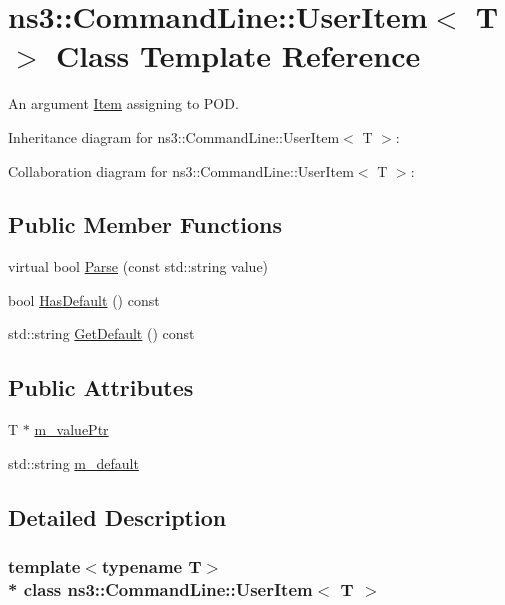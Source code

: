 \hypertarget{classns3_1_1CommandLine_1_1UserItem}{}\section{ns3\+:\+:Command\+Line\+:\+:User\+Item$<$ T $>$ Class Template Reference}
\label{classns3_1_1CommandLine_1_1UserItem}


An argument \hyperlink{classns3_1_1CommandLine_1_1Item}{Item} assigning to P\+OD.  




Inheritance diagram for ns3\+:\+:Command\+Line\+:\+:User\+Item$<$ T $>$\+:


Collaboration diagram for ns3\+:\+:Command\+Line\+:\+:User\+Item$<$ T $>$\+:
\subsection*{Public Member Functions}
\begin{DoxyCompactItemize}
\item 
virtual bool \hyperlink{classns3_1_1CommandLine_1_1UserItem_a1e35f03bcc7eea7343fcef8beec53dbb}{Parse} (const std\+::string value)
\item 
bool \hyperlink{classns3_1_1CommandLine_1_1UserItem_a18237c339378d9f7f21ee8afd9361a1d}{Has\+Default} () const 
\item 
std\+::string \hyperlink{classns3_1_1CommandLine_1_1UserItem_a8beb0fdb64ff17d1e4717e3b4c50c573}{Get\+Default} () const 
\end{DoxyCompactItemize}
\subsection*{Public Attributes}
\begin{DoxyCompactItemize}
\item 
T $\ast$ \hyperlink{classns3_1_1CommandLine_1_1UserItem_ac07a831897e30a5f366a18193399e065}{m\+\_\+value\+Ptr}
\item 
std\+::string \hyperlink{classns3_1_1CommandLine_1_1UserItem_a0e5ee26cfa7f97437ef7b04065144027}{m\+\_\+default}
\end{DoxyCompactItemize}


\subsection{Detailed Description}
\subsubsection*{template$<$typename T$>$\\*
class ns3\+::\+Command\+Line\+::\+User\+Item$<$ T $>$}

